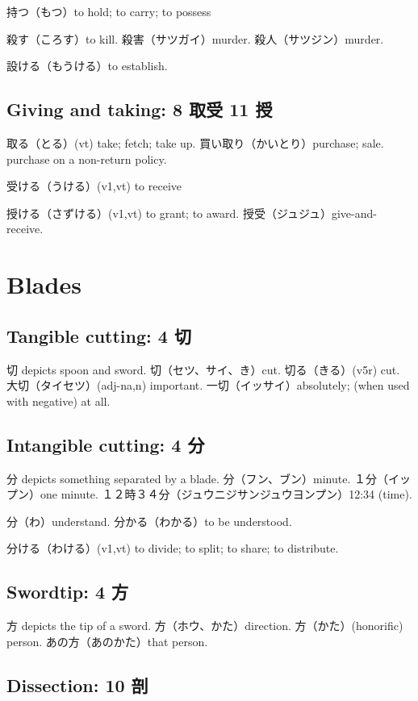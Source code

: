持つ（もつ）to hold; to carry; to possess

殺す（ころす）to kill.
殺害（サツガイ）murder.
殺人（サツジン）murder.

設ける（もうける）to establish.

\subsection{Giving and taking: 8 取受 11 授}

取る（とる）(vt) take; fetch; take up.
買い取り（かいとり）purchase; sale. purchase on a non-return policy.

受ける（うける）(v1,vt) to receive

授ける（さずける）(v1,vt) to grant; to award.
授受（ジュジュ）give-and-receive.

\section{Blades}

\subsection{Tangible cutting: 4 切}

切 depicts spoon and sword.
切（セツ、サイ、き）cut.
切る（きる）(v5r) cut.
大切（タイセツ）(adj-na,n) important.
一切（イッサイ）absolutely; (when used with negative) at all.

\subsection{Intangible cutting: 4 分}

分 depicts something separated by a blade.
分（フン、ブン）minute.
１分（イップン）one minute.
１２時３４分（ジュウニジサンジュウヨンプン）12:34 (time).

分（わ）understand.
分かる（わかる）to be understood.

分ける（わける）(v1,vt) to divide; to split; to share; to distribute.

\subsection{Swordtip: 4 方}

方 depicts the tip of a sword.
方（ホウ、かた）direction.
方（かた）(honorific) person.
あの方（あのかた）that person.

\subsection{Dissection: 10 剖}

